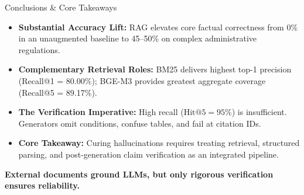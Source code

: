 \begin{frame}{Conclusions \& Core Takeaways}
  \vspace{0.1cm}
  \begin{itemize}
    \setlength{\itemsep}{0.25cm}
    \item \textbf{Substantial Accuracy Lift:} RAG elevates core factual correctness from 0\% in an unaugmented baseline to 45--50\% on complex administrative regulations.
    \item \textbf{Complementary Retrieval Roles:} BM25 delivers highest top-1 precision (Recall@1 = 80.00\%); BGE-M3 provides greatest aggregate coverage (Recall@5 = 89.17\%).
    \item \textbf{The Verification Imperative:} High recall ($\text{Hit@5} = 95\%$) is insufficient. Generators omit conditions, confuse tables, and fail at citation IDs.
    \item \textbf{Core Takeaway:} Curing hallucinations requires treating retrieval, structured parsing, and post-generation claim verification as an integrated pipeline.
  \end{itemize}

  \vfill
  \begin{center}
    {\large\bfseries\color{primaryblue} External documents ground LLMs, but only rigorous verification ensures reliability.}
  \end{center}

\end{frame}
